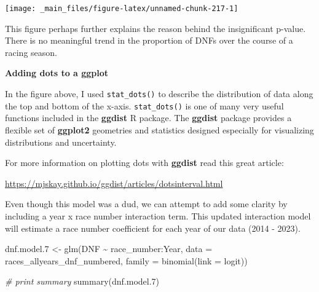 \documentclass[
]{book}
\newenvironment{Shaded}{\begin{snugshade}}{\end{snugshade}}
\newcommand{\AttributeTok}[1]{\textcolor[rgb]{0.77,0.63,0.00}{#1}}
\newcommand{\CommentTok}[1]{\textcolor[rgb]{0.56,0.35,0.01}{\textit{#1}}}
\newcommand{\FloatTok}[1]{\textcolor[rgb]{0.00,0.00,0.81}{#1}}
\newcommand{\FunctionTok}[1]{\textcolor[rgb]{0.00,0.00,0.00}{#1}}
\newcommand{\NormalTok}[1]{#1}
\newcommand{\OtherTok}[1]{\textcolor[rgb]{0.56,0.35,0.01}{#1}}
\newcommand{\SpecialCharTok}[1]{\textcolor[rgb]{0.00,0.00,0.00}{#1}}
\newcommand{\StringTok}[1]{\textcolor[rgb]{0.31,0.60,0.02}{#1}}
\begin{document}
\begin{center}\texttt{[image: \_main\_files/figure-latex/unnamed-chunk-217-1]} \end{center}

This figure perhaps further explains the reason behind the insignificant p-value. There is no meaningful trend in the proportion of DNFs over the course of a racing season.

\begin{blackbox}

\begin{center}
\textbf{Adding dots to a ggplot}

\end{center}

In the figure above, I used \texttt{stat\_dots()} to describe the distribution of data along the top and bottom of the x-axis. \texttt{stat\_dots()} is one of many very useful functions included in the \textbf{ggdist} R package. The \textbf{ggdist} package provides a flexible set of \textbf{ggplot2} geometries and statistics designed especially for visualizing distributions and uncertainty.

For more information on plotting dots with \textbf{ggdist} read this great article:

\url{https://mjskay.github.io/ggdist/articles/dotsinterval.html}

\end{blackbox}

Even though this model was a dud, we can attempt to add some clarity by including a year x race number interaction term. This updated interaction model will estimate a race number coefficient for each year of our data (2014 - 2023).

\begin{Shaded}
\begin{Highlighting}[]
\NormalTok{dnf.model}\FloatTok{.7} \OtherTok{\textless{}{-}} \FunctionTok{glm}\NormalTok{(DNF }\SpecialCharTok{\textasciitilde{}}\NormalTok{ race\_number}\SpecialCharTok{:}\NormalTok{Year, }\AttributeTok{data =}\NormalTok{ races\_allyears\_dnf\_numbered,}
                   \AttributeTok{family =} \FunctionTok{binomial}\NormalTok{(}\AttributeTok{link =} \StringTok{\textquotesingle{}logit\textquotesingle{}}\NormalTok{))}

\CommentTok{\# print summary}
\FunctionTok{summary}\NormalTok{(dnf.model}\FloatTok{.7}\NormalTok{)}
\end{Highlighting}
\end{Shaded}
\end{document}
